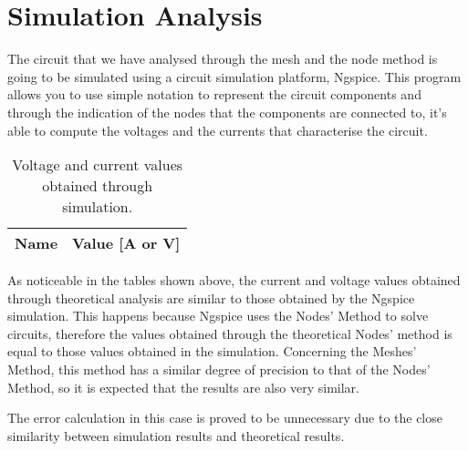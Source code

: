 \section{Simulation Analysis}
\label{sec:simulation}

The circuit that we have analysed through the mesh and the node method is going to be simulated using a circuit simulation platform, Ngspice. This program allows you to use simple notation to represent the circuit components and through the indication of the nodes that the components are connected to, it's able to compute the voltages and the currents that characterise the circuit.

\begin{table}[h]
  \centering
  \begin{tabular}{|l|r|}
    \hline    
    {\bf Name} & {\bf Value [A or V]} \\ \hline
    
  \end{tabular}
  \caption{Voltage and current values obtained through simulation.}
  \label{tab:op}
\end{table}


As noticeable in the tables shown above, the current and voltage values obtained through theoretical analysis are similar to those obtained by the Ngspice simulation. This happens because Ngspice uses the Nodes' Method to solve circuits, therefore the values obtained through the theoretical Nodes' method is equal to those values obtained in the simulation. Concerning the Meshes' Method, this method has a similar degree of precision to that of the Nodes' Method, so it is expected that the results are also very similar.

The error calculation in this case is proved to be unnecessary due to the close similarity between simulation results and theoretical results.
